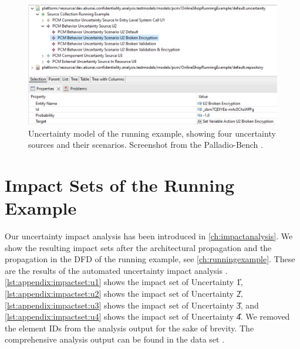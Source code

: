 \begin{figure}
    \centering
    \includegraphics[width=\textwidth]{figures/chapter12/runningexample_uncertainty.pdf}
    \caption[Uncertainty model of the running example, showing four uncertainty sources and their scenarios.]{Uncertainty model of the running example, showing four uncertainty sources and their scenarios. Screenshot from the Palladio-Bench \cite{reussner_palladio_2024}.}
    \label{fig:appendix:runningexample:uncertainty}
\end{figure}





\chapter{Impact Sets of the Running Example}%
\label{sec:appendix:impactset}

Our uncertainty impact analysis has been introduced in \autoref{ch:impactanalysis}.
We show the resulting impact sets after the architectural propagation and the propagation in the \acf{DFD} of the running example, see \autoref{ch:runningexample}.
These are the results of the automated uncertainty impact analysis \uia.
\autoref{lst:appendix:impactset:u1} shows the impact set of Uncertainty \U{1}, \autoref{lst:appendix:impactset:u2} shows the impact set of Uncertainty \U{2}, \autoref{lst:appendix:impactset:u3} shows the impact set of Uncertainty \U{3}, and \autoref{lst:appendix:impactset:u4} shows the impact set of Uncertainty \U{4}.
We removed the element IDs from the analysis output for the sake of brevity.
The comprehensive analysis output can be found in the data set \cite{dataset}.

